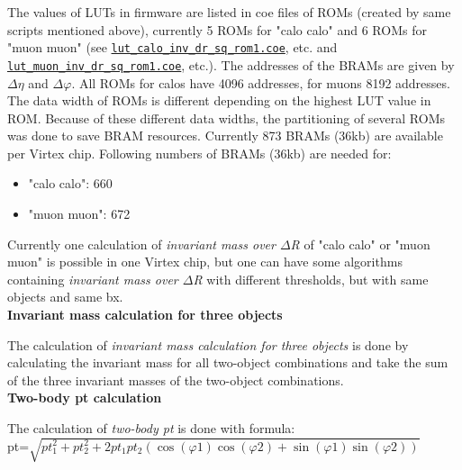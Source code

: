 The values of LUTs in firmware are listed in coe files of ROMs (created by same scripts mentioned above), currently 5 ROMs for "calo calo" and 6 ROMs for "muon muon" (see \href{https://github.com/cms-l1-globaltrigger/mp7_ugt_legacy/tree/master/firmware/ngc/lut_calo_inv_dr_sq_rom1.coe}{\texttt{lut\_calo\_inv\_dr\_sq\_rom1.coe}}, etc. and \href{https://github.com/cms-l1-globaltrigger/mp7_ugt_legacy/tree/master/firmware/ngc/lut_muon_inv_dr_sq_rom1.coe}{\texttt{lut\_muon\_inv\_dr\_sq\_rom1.coe}}, etc.). The addresses of the BRAMs are given by $\Delta\eta$ and $\Delta\varphi$. All ROMs for calos have 4096 addresses, for muons 8192 addresses. The data width of ROMs is different depending on the highest LUT value in ROM. Because of these different data widths, the partitioning of several ROMs was done to save BRAM resources. Currently 873 BRAMs (36kb) are available per Virtex chip.
Following numbers of BRAMs (36kb) are needed for:
\begin{itemize}
\item "calo calo": 660
\item "muon muon": 672
\end{itemize}
Currently one calculation of \textit{invariant mass over $\Delta$R} of "calo calo" or "muon muon" is possible in one Virtex chip, but one can have some algorithms containing \textit{invariant mass over $\Delta$R} with different thresholds, but with same objects and same bx.\\

\textbf{Invariant mass calculation for three objects}
\label{sec:gtl:inv_mass_3_obj_calculation}

The calculation of \textit{invariant mass calculation for three objects} is done by calculating the invariant mass for all two-object combinations and take the sum of the three invariant masses of the two-object combinations.\\

\textbf{Two-body pt calculation}
\label{sec:gtl:twobody_pt_calculation}

The calculation of \textit{two-body pt} is done with formula:\\

pt=$\sqrt{pt^2_1 + pt^2_2 + 2  pt_1 pt_2 (\cos(\varphi1) \cos(\varphi2) + \sin(\varphi1) \sin(\varphi2))}$\\

